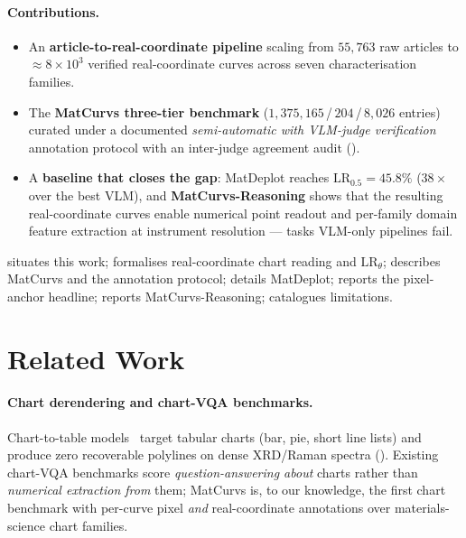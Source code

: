 \documentclass{article}
\begin{document}
\paragraph{Contributions.}
\begin{itemize}\itemsep -2pt
\item An \textbf{article-to-real-coordinate pipeline} scaling from
$55{,}763$ raw articles to $\approx 8{\times}10^{3}$ verified
real-coordinate curves across seven characterisation families.
\item The \textbf{MatCurvs three-tier benchmark}
($1{,}375{,}165$\,/\,$204$\,/\,$8{,}026$ entries) curated under a
documented \emph{semi-automatic with VLM-judge verification}
annotation protocol with an inter-judge agreement audit
().
\item A \textbf{baseline that closes the gap}: MatDeplot reaches
$\mathrm{LR}_{0.5}{=}45.8\%$ ($38\times$ over the best VLM), and
\textbf{MatCurvs-Reasoning} shows that the resulting real-coordinate
curves enable numerical point readout and per-family domain feature
extraction at instrument resolution --- tasks VLM-only pipelines fail.
\end{itemize}

 situates this work;
 formalises real-coordinate chart reading and
$\mathrm{LR}_{\theta}$;
 describes MatCurvs and the annotation protocol;
 details MatDeplot;
 reports the pixel-anchor headline;
 reports MatCurvs-Reasoning;
 catalogues limitations.

\section{Related Work}
\label{sec:related}

\paragraph{Chart derendering and chart-VQA benchmarks.}
Chart-to-table models~\citep{deplot,matcha,unichart,onechart,
chartassistant} target tabular charts (bar, pie, short line lists)
and produce zero recoverable polylines on dense XRD/Raman spectra
(). Existing chart-VQA benchmarks
\citep{chartqa,plotqa,charxiv,chartbench} score
\emph{question-answering about} charts rather than \emph{numerical
extraction from} them; MatCurvs is, to our knowledge, the first
chart benchmark with per-curve pixel \emph{and} real-coordinate
annotations over materials-science chart families.
\end{document}

